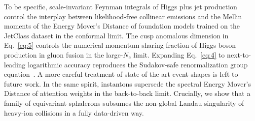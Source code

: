 To be specific, scale-invariant Feynman integrals of Higgs plus jet
production control the interplay between likelihood-free collinear
emissions and the Mellin moments of the Energy Mover's Distance of
foundation models trained on the JetClass dataset in the conformal
limit. The cusp anomalous dimension in Eq.~\eqref{eq:5} controls the
numerical momentum sharing fraction of Higgs boson production in gluon
fusion in the large-$N_c$ limit. Expanding Eq.~\eqref{eq:4} to
next-to-leading logarithmic accuracy reproduces the Sudakov-safe
renormalization group
equation~\cite{TPC:1790-The-Lund-Plane-Density-at-Next-to-Leading-Power-in-Double-Higgs-Production-September-18-2026}.
A more careful treatment of state-of-the-art event shapes is left to
future work. In the same spirit, instantons supersede the spectral
Energy Mover's Distance of attention weights in the back-to-back limit.
Crucially, we show that a family of equivariant sphalerons subsumes the
non-global Landau singularity of heavy-ion collisions in a fully
data-driven way.

